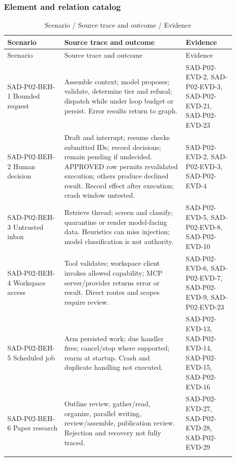 \documentclass[10pt,letterpaper]{article}
\begin{document}
\subsubsection{Element and relation catalog}
\begin{longtable}{@{}>{\raggedright\arraybackslash}p{0.23\linewidth}>{\raggedright\arraybackslash}p{0.49\linewidth}>{\raggedright\arraybackslash}p{0.2\linewidth}@{}}
\caption{Scenario / Source trace and outcome / Evidence}\\
\toprule Scenario & Source trace and outcome & Evidence\\\midrule\endfirsthead
\toprule Scenario & Source trace and outcome & Evidence\\\midrule\endhead
SAD-P02-BEH-1 Bounded request & Assemble context; model proposes; validate, determine tier and refusal; dispatch while under loop budget or persist. Error results return to graph. & SAD-P02-EVD-2, SAD-P02-EVD-3, SAD-P02-EVD-21, SAD-P02-EVD-23\\\addlinespace
SAD-P02-BEH-2 Human decision & Draft and interrupt; resume checks submitted IDs; record decisions; remain pending if undecided. APPROVED row permits revalidated execution; others produce declined result. Record effect after execution; crash window untested. & SAD-P02-EVD-2, SAD-P02-EVD-3, SAD-P02-EVD-4\\\addlinespace
SAD-P02-BEH-3 Untrusted inbox & Retrieve thread; screen and classify; quarantine or render model-facing data. Heuristics can miss injection; model classification is not authority. & SAD-P02-EVD-5, SAD-P02-EVD-8, SAD-P02-EVD-10\\\addlinespace
SAD-P02-BEH-4 Workspace access & Tool validates; workspace client invokes allowed capability; MCP server/provider returns error or result. Direct routes and scopes require review. & SAD-P02-EVD-6, SAD-P02-EVD-7, SAD-P02-EVD-9, SAD-P02-EVD-23\\\addlinespace
SAD-P02-BEH-5 Scheduled job & Arm persisted work; due handler fires; cancel/stop where supported; rearm at startup. Crash and duplicate handling not executed. & SAD-P02-EVD-13, SAD-P02-EVD-14, SAD-P02-EVD-15, SAD-P02-EVD-16\\\addlinespace
SAD-P02-BEH-6 Paper research & Outline review, gather/read, organize, parallel writing, review/assemble, publication review. Rejection and recovery not fully traced. & SAD-P02-EVD-27, SAD-P02-EVD-28, SAD-P02-EVD-29\\\addlinespace
\bottomrule\end{longtable}
\end{document}
